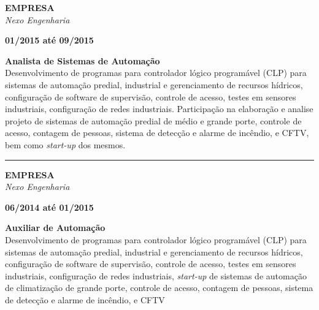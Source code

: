 \documentclass[12pt, a4paper]{article}
\newcommand{\LlinhaM}{1pt} 	 %
\newcommand{\TlinhaM}{17cm}		 %
\begin{document}
\begin{multicols}{2}
	\begin{flushleft}
		\textbf{EMPRESA}\\
		\textit{Nexo Engenharia}\\
	\end{flushleft}
	\vfill
	\begin{flushright}
		\textbf{01/2015 até 09/2015}\\
	\end{flushright}
\end{multicols}
\begin{flushleft}
	\textbf{Analista de Sistemas de Automação}\\
	Desenvolvimento de programas para controlador lógico programável (CLP) para sistemas de automação predial, industrial e gerenciamento de recursos hídricos, 	configuração de software de supervisão, controle de acesso, testes em sensores industriais, configuração de redes industriais. Participação na elaboração e analise projeto de sistemas de automação predial de médio e grande porte, controle de acesso, contagem de pessoas, sistema de detecção e alarme de incêndio, e CFTV, bem como \textit{start-up} dos mesmos.\\
\end{flushleft}

\begin{center}
	\rule{\TlinhaM}{\LlinhaM}
\end{center}

\begin{multicols}{2}
	\begin{flushleft}
		\textbf{EMPRESA}\\
		\textit{Nexo Engenharia}\\
	\end{flushleft}
	\vfill
	\begin{flushright}
		\textbf{06/2014 até 01/2015}\\
	\end{flushright}
\end{multicols}
\begin{flushleft}
	\textbf{Auxiliar de Automação}\\
	Desenvolvimento de programas para controlador lógico programável (CLP) para sistemas de automação predial, industrial e gerenciamento de recursos hídricos, configuração de software de supervisão, controle de acesso, testes em sensores industriais, configuração de redes industriais, \textit{start-up} de sistemas de automação de climatização de grande porte, controle de acesso, contagem de pessoas, sistema de detecção e alarme de incêndio, e CFTV\\
\end{flushleft}
\end{document}
